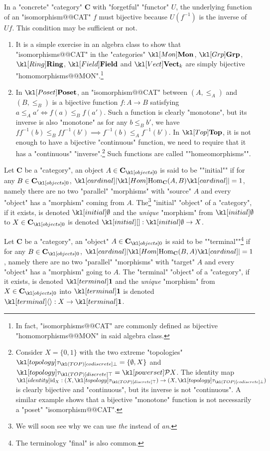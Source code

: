 \documentclass[main.tex]{subfiles}
\begin{document}
\begin{exmps}\label{exmps:isoconcrete}
	In a "concrete" "category" $\mathbf{C}$ with "forgetful" "functor" $U$, the underlying function of an "isomorphism@@CAT" $f$ must bijective because $U(f^{-1})$ is the inverse of $Uf$. This condition may be sufficient or not.
	\begin{enumerate}
		\item It is a simple exercise in an algebra class to show that "isomorphisms@@CAT" in the "categories" $\catMon$, $\catGrp$, $\catRing$, $\catField$ and $\catVect{k}$ are simply bijective "homomorphisms@@MON".\footnote{In fact, "isomorphisms@@CAT" are commonly defined as bijective "homomorphisms@@MON" in said algebra class.}
		\item\label{exmp:isoposet} In $\catPoset$, an "isomorphism@@CAT" between $(A,\leq_A)$ and $(B,\leq_B)$ is a bijective function $f: A \rightarrow B$ satisfying $a\leq_A a' \Leftrightarrow f(a) \leq_B f(a')$. Such a function is clearly "monotone", but its inverse is also "monotone" as for any $b\leq_B b'$, we have $ff^{-1}(b) \leq_B ff^{-1}(b') \implies f^{-1}(b) \leq_A f^{-1}(b')$.
		\itemAP In $\catTop$, it is not enough to have a bijective "continuous" function, we need to require that it has a "continuous" "inverse".\footnote{Consider $X = \{0,1\}$ with the two extreme "topologies" $\topo_{\codisc} = \{\emptyset,X\}$ and $\topo_{\disc} = \mP X$. The identity map $\id_X : (X, \topo_{\disc}) \rightarrow (X,\topo_{\codisc})$ is clearly bijective and "continuous", but its inverse is not "continuous". A similar example shows that a bijective "monotone" function is not necessarily a "poset" "isomorphism@@CAT".} Such functions are called ""homeomorphisms"".
	\end{enumerate}
\end{exmps}
\begin{defn}
	\AP Let $\mathbf{C}$ be a "category", an object $A \in \obj{\mathbf{C}}$ is said to be ""initial"" if for any $B \in \obj{\mathbf{C}}$, $\cardinal{\Hom_{\mathbf{C}}(A,B)} = 1$, namely there are no two "parallel" "morphisms" with "source" $A$ and every "object" has a "morphism" coming from $A$. The\footnote{We will soon see why we can use \textit{the} instead of \textit{an}.} "initial" "object" of a "category", if it exists, is denoted $\initial$ and the \textit{unique} "morphism" from $\initial$ to $X\in \obj{\mathbf{C}}$ is denoted $\initmorph: \initial \rightarrow X$.
\end{defn}
\begin{defn}
	\AP Let $\mathbf{C}$ be a "category", an "object" $A \in \obj{\mathbf{C}}$ is said to be ""terminal""\footnote{The terminology "final" is also common.} if for any $B \in \obj{\mathbf{C}}$, $\cardinal{\Hom_{\mathbf{C}}(B,A)} = 1$, namely there are no two "parallel" "morphisms" with "target" $A$ and every "object" has a "morphism" going to $A$. The "terminal" "object" of a "category", if it exists, is denoted $\terminal$ and the \textit{unique} "morphism" from $X \in \obj{\mathbf{C}}$ into $\terminal$ is denoted $\termmorph:X \rightarrow \terminal$.
\end{defn}
\end{document}
